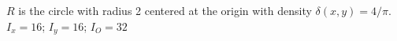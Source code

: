 {$R$ is the circle with radius 2 centered at the origin with density $\delta(x,y) = 4/\pi$. 
}
{$I_x = 16$; $I_y = 16$; $I_O = 32$
}
